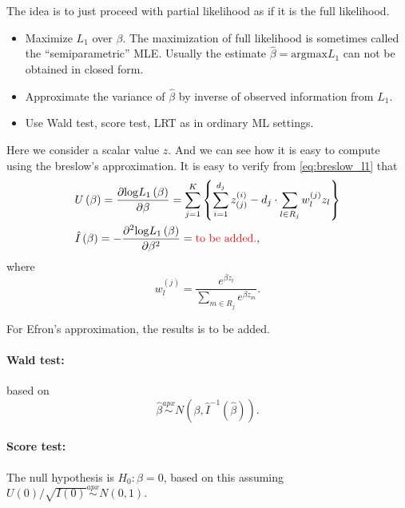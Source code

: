 \documentclass[a4paper,12pt]{article}
\begin{document}
The idea is to just proceed with partial likelihood as if it is the full likelihood.
\begin{itemize}
\item Maximize $L_1$ over $\beta$. The maximization of full likelihood is sometimes called the ``semiparametric'' MLE. Usually the estimate $\hat{\beta} = \mathrm{argmax}L_1$ can not be obtained in closed form.
\item Approximate the variance of $\hat{\beta}$ by inverse of observed information from $L_1$.
\item Use Wald test, score test, LRT as in ordinary ML settings.
\end{itemize}


Here we consider a scalar value $z$. And we can see how it is easy to compute using the breslow's approximation. It is easy to verify from \eqref{eq:breslow_l1} that
\[
  \begin{aligned}
    & U\left(\beta\right) =
  \frac{\partial \mathrm{log}L_1\left(\beta\right)}{\partial \beta}
  = \sum\limits_{j = 1}^K\left\{
    \sum\limits_{i = 1}^{d_j}z_{\left(j\right)}^{\left(i\right)}
    - d_j
    \cdot
    \sum\limits_{l \in R_j}w_l^{\left(j\right)}z_l
  \right\}    \\
  & \hat{I}\left(\beta\right)
  = -\frac{\partial^2\mathrm{log}L_1\left(\beta\right)}{\partial \beta^2}
  = {\color{red}\text{to be added.}}
  ,
  \end{aligned}
\]
where
\[
  w_l^{\left(j\right)} = \frac{
    e^{\beta z_l}
  }{
    \sum\limits_{m\in R_j}e^{\beta z_m}
  }
  .
\]

For Efron's approximation, the results is {\color{red}to be added.}

\paragraph{Wald test:}

based on
\[
  \hat{\beta} \overset{apx}{\sim}
  N\left(\beta, \hat{I}^{-1}\left(\hat{\beta}\right)\right)
  .
\]

\paragraph{Score test:}

The null hypothesis is $H_0:\beta = 0$, based on this assuming $U\left(0\right) / \sqrt{I\left(0\right)} \overset{apx}{\sim}N\left(0, 1\right)$.





\end{document}
